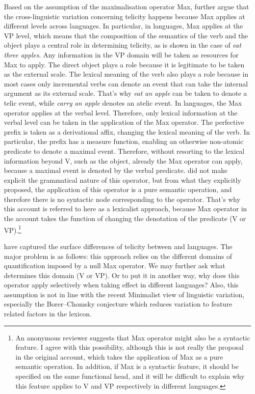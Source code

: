 \documentclass[output=paper]{langsci/langscibook}
\begin{document}
Based on the assumption of the maximalisation operator Max,
\textcite{filiprothstein2005} further argue that the cross-linguistic variation
concerning telicity happens because Max applies at different levels
across languages. In particular, in  languages, Max applies at
the VP level, which means that the composition of the semantics of the verb and
the object plays a central role in determining telicity, as is shown in the
case of \emph{eat three apples}. Any information in the VP domain will be
taken as resources for Max to apply. The direct object plays a role
because it is legitimate to be taken as the external scale. The lexical meaning
of the verb also plays a role because in most cases only incremental verbs can
denote an event that can take the internal argument as its external scale.
That's why \emph{eat an apple} can be taken to denote a telic event, while
\emph{carry an apple} denotes an atelic event. In  languages, the
Max operator applies at the verbal level. Therefore, only lexical
information at the verbal level can be taken in the application of the
Max operator. The perfective prefix is taken as a derivational affix,
changing the lexical meaning of the verb. In particular, the prefix has a
measure function, enabling an otherwise non-atomic predicate to denote a
maximal event. Therefore, without resorting to the lexical information beyond
V, such as the object, already the Max operator can apply, because a
maximal event is denoted by the verbal predicate. \textcite{filiprothstein2005}
did not make explicit the grammatical nature of this operator, but from what
they explicitly proposed, the application of this operator is a pure semantic
operation, and therefore there is no syntactic node corresponding to the
operator. That’s why this account is referred to here as a lexicalist approach,
because Max operator in the account takes the function of changing the
denotation of the predicate (V or VP).\footnote{An anonymous reviewer suggests
that Max operator might also be a syntactic feature. I agree with this
possibility, although this is not really the proposal in the original account,
which takes the application of Max as a pure semantic operation. In
addition, if Max is a syntactic feature, it should be specified on the
same functional head, and it will be difficult to explain why this feature
applies to V and VP respectively in different languages.}

\textcite{filiprothstein2005} have captured the surface differences of telicity
be\-tween  and  languages. The major problem is as follows: this
approach relies on the different domains of quantification imposed by a null
Max operator. We may further ask what determines this domain (V or VP).
Or to put it in another way, why does this operator apply selectively when
taking effect in different languages? Also, this assumption is not in line with
the recent Minimalist view of linguistic variation, especially the
Borer--Chomsky conjecture \citep[cf.][]{Baker2008,RobHol2010} which
reduces variation to feature related factors in the lexicon.
\end{document}
